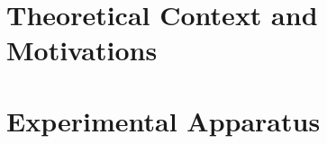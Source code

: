 \documentclass[oneside,12pt,final]{sty/ucthesis-CA2012}
\begin{document}
\begin{frontmatter}
	
	\maketitle
	\approvalpage
	\copyrightpage
	
	
	
	\tableofcontents
        \listoffigures
        \listoftables
\end{frontmatter}

\begin{mainmatter}

\pagestyle{fancy}
\renewcommand{\chaptermark}[1]{\markboth{{\sf #1 \hspace*{\fill} Chapter~\thechapter}}{} }
\renewcommand{\sectionmark}[1]{\markright{ {\sf Section~\thesection \hspace*{\fill} #1 }}}
\fancyhf{}

\makeatletter \if@twoside \fancyhead[LO]{\small \rightmark} \fancyhead[RE]{\small\leftmark} \else \fancyhead[LO]{\small\leftmark}
\fancyhead[RE]{\small\rightmark} \fi

\def\cleardoublepage{\clearpage\if@openright \ifodd\c@page\else
  \hbox{}
  \vspace*{\fill}
  \begin{center}
    This page intentionally left blank
  \end{center}
  \vspace{\fill}
  \thispagestyle{plain}
  \newpage
  \fi \fi}
\makeatother
\fancyfoot[c]{\textrm{\textup{\thepage}}} %
\fancyfoot[C]{\thepage}
\renewcommand{\headrulewidth}{0.4pt}

 { \fancyhf{} \fancyfoot[C]{\thepage}
\renewcommand{\headrulewidth}{0pt}
\renewcommand{\footrulewidth}{0pt}}


\part{Theoretical Context and Motivations}


\part{Experimental Apparatus}



\end{mainmatter}
\end{document}
